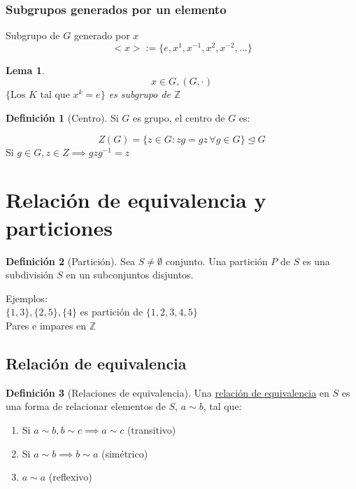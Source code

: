 \documentclass[11pt]{book}
\newtheorem{lem}[thm]{Lema}
\theoremstyle{definition}
\newtheorem{defn}{Definición}[section]
\begin{document}
\subsubsection{Subgrupos generados por un elemento}
Subgrupo de $G$ generado por $x$
\[
<x>:=\{e,x^1,x^{-1},x^2,x^{-2},...\}
\]

\begin{lem}
	\[x\in G, (G,\cdot)\]
	$\{\textrm{Los $K$ tal que $x^k=e$}\}$ es subgrupo de $\mathbb{Z}$
\end{lem}

\begin{defn}[Centro]
	Si $G$ es grupo, el centro de $G$ es:
\end{defn}
\[
Z(G)=\{z\in G: zg=gz\,\forall g\in G\}\trianglelefteq G
\]
Si $g\in G,z\in Z\implies gzg^{-1}=z$
\section{Relación de equivalencia y particiones}
\begin{defn}[Partición]
	Sea $S\neq\emptyset$ conjunto. Una partición $P$ de $S$ es una subdivisión $S$ en un subconjuntos disjuntos.
\end{defn}
Ejemplos:\\
$\{1,3\},\{2,5\},\{4\}$ es partición de $\{1,2,3,4,5\}$\\
Pares e impares en $\mathbb{Z}$
\subsection{Relación de equivalencia}
\begin{defn}[Relaciones de equivalencia]
	Una \underline{relación de equivalencia} en $S$ es una forma de relacionar elementos de $S$, $a\sim b$, tal que:
	\begin{enumerate}[label=(\arabic*)]
		\item Si $a\sim b,b\sim c\implies a\sim c$ (transitivo)
		
		\item Si $a\sim b\implies b\sim a$ (simétrico)
		
		\item $a\sim a$ (reflexivo)
	\end{enumerate}
\end{defn}
\end{document}
